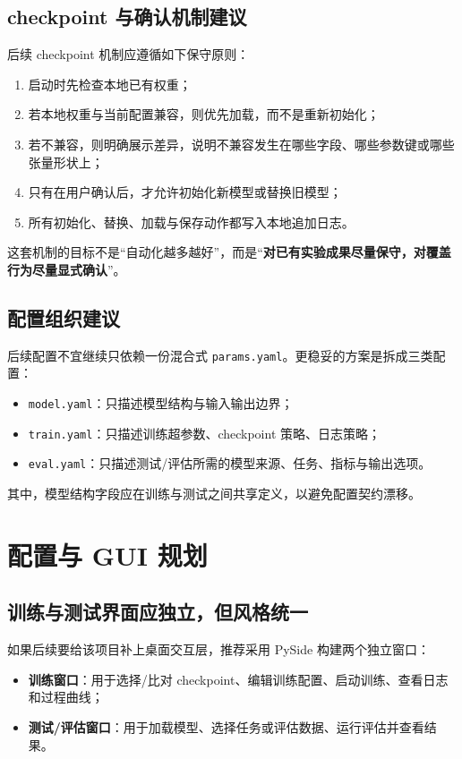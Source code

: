 \documentclass[11pt,fontset=none]{ctexart}
\begin{document}
\subsection{checkpoint 与确认机制建议}

后续 checkpoint 机制应遵循如下保守原则：
\begin{enumerate}[leftmargin=2em]
  \item 启动时先检查本地已有权重；
  \item 若本地权重与当前配置兼容，则优先加载，而不是重新初始化；
  \item 若不兼容，则明确展示差异，说明不兼容发生在哪些字段、哪些参数键或哪些张量形状上；
  \item 只有在用户确认后，才允许初始化新模型或替换旧模型；
  \item 所有初始化、替换、加载与保存动作都写入本地追加日志。
\end{enumerate}

这套机制的目标不是“自动化越多越好”，而是“\textbf{对已有实验成果尽量保守，对覆盖行为尽量显式确认}”。

\subsection{配置组织建议}

后续配置不宜继续只依赖一份混合式 \texttt{params.yaml}。更稳妥的方案是拆成三类配置：
\begin{itemize}[leftmargin=2em]
  \item \texttt{model.yaml}：只描述模型结构与输入输出边界；
  \item \texttt{train.yaml}：只描述训练超参数、checkpoint 策略、日志策略；
  \item \texttt{eval.yaml}：只描述测试/评估所需的模型来源、任务、指标与输出选项。
\end{itemize}

其中，模型结构字段应在训练与测试之间共享定义，以避免配置契约漂移。

\section{配置与 GUI 规划}

\subsection{训练与测试界面应独立，但风格统一}

如果后续要给该项目补上桌面交互层，推荐采用 PySide 构建两个独立窗口：
\begin{itemize}[leftmargin=2em]
  \item \textbf{训练窗口}：用于选择/比对 checkpoint、编辑训练配置、启动训练、查看日志和过程曲线；
  \item \textbf{测试/评估窗口}：用于加载模型、选择任务或评估数据、运行评估并查看结果。
\end{itemize}
\end{document}
